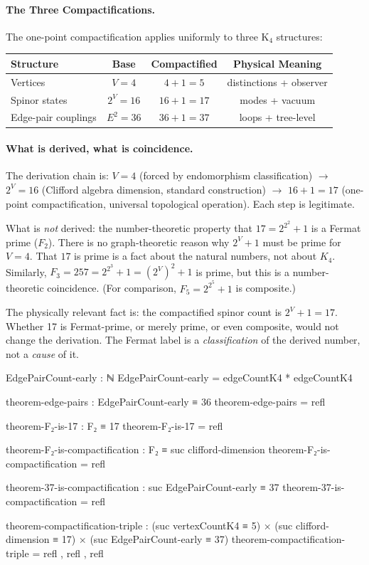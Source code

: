 \documentclass[11pt,a4paper]{book}
\begin{document}
\paragraph{The Three Compactifications.}
The one-point compactification applies uniformly to three K$_4$ structures:

\begin{center}
\begin{tabular}{lccc}
\hline
\textbf{Structure} & \textbf{Base} & \textbf{Compactified} & \textbf{Physical Meaning} \\
\hline
Vertices           & $V = 4$       & $4 + 1 = 5$           & distinctions + observer \\
Spinor states      & $2^V = 16$    & $16 + 1 = 17$         & modes + vacuum \\
Edge-pair couplings& $E^2 = 36$    & $36 + 1 = 37$         & loops + tree-level \\
\hline
\end{tabular}
\end{center}

\paragraph{What is derived, what is coincidence.}
The derivation chain is: $V=4$ (forced by endomorphism classification) $\to$ $2^V = 16$
(Clifford algebra dimension, standard construction) $\to$ $16+1 = 17$ (one-point
compactification, universal topological operation). Each step is legitimate.

What is \emph{not} derived: the number-theoretic property that $17 = 2^{2^2}+1$ is a
Fermat prime ($F_2$). There is no graph-theoretic reason why $2^V + 1$ must be prime
for $V=4$. That $17$ is prime is a fact about the natural numbers, not about $K_4$.
Similarly, $F_3 = 257 = 2^{2^3}+1 = (2^V)^2+1$ is prime, but this is a number-theoretic
coincidence. (For comparison, $F_5 = 2^{2^5}+1$ is composite.)

The physically relevant fact is: the compactified spinor count is $2^V + 1 = 17$.
Whether 17 is Fermat-prime, or merely prime, or even composite, would not change the
derivation. The Fermat label is a \emph{classification} of the derived number, not a
\emph{cause} of it.

\begin{code}
EdgePairCount-early : ℕ
EdgePairCount-early = edgeCountK4 * edgeCountK4

theorem-edge-pairs : EdgePairCount-early ≡ 36
theorem-edge-pairs = refl

theorem-F₂-is-17 : F₂ ≡ 17
theorem-F₂-is-17 = refl

theorem-F₂-is-compactification : F₂ ≡ suc clifford-dimension
theorem-F₂-is-compactification = refl

theorem-37-is-compactification : suc EdgePairCount-early ≡ 37
theorem-37-is-compactification = refl

theorem-compactification-triple : 
  (suc vertexCountK4 ≡ 5) × (suc clifford-dimension ≡ 17) × (suc EdgePairCount-early ≡ 37)
theorem-compactification-triple = refl , refl , refl
\end{code}
\end{document}
